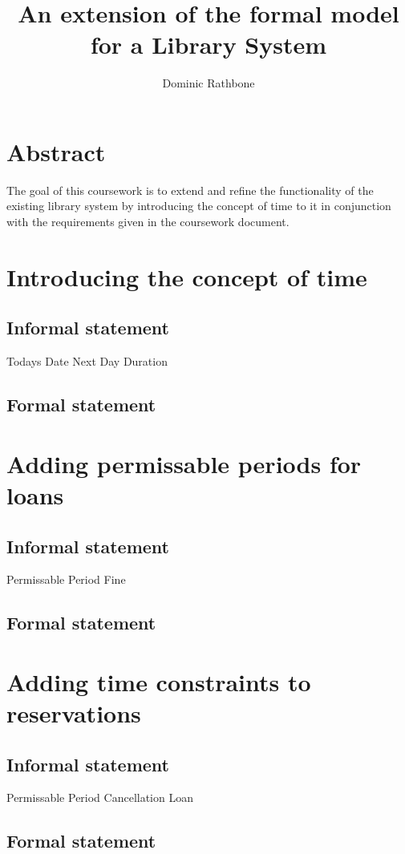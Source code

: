 \documentclass[]{article}
\title{An extension of the formal model for a Library System}
\author{Dominic Rathbone}
\begin{document}
\maketitle

\section{Abstract}
The goal of this coursework is to extend and refine the functionality of the existing library system by introducing the concept of time to it in conjunction with the requirements given in the coursework document.

\section{Introducing the concept of time}
\subsection{Informal statement}
Todays Date
Next Day
Duration
\subsection{Formal statement}


\section{Adding permissable periods for loans}
\subsection{Informal statement}
Permissable Period
Fine
\subsection{Formal statement}

\section{Adding time constraints to reservations}
\subsection{Informal statement}
Permissable Period
Cancellation
Loan
\subsection{Formal statement}
\end{document}
